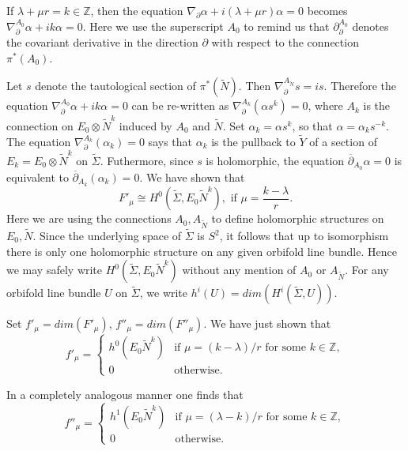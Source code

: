 \documentclass{amsart}
\theoremstyle{definition}
\theoremstyle{remark}
\numberwithin{equation}{section}
\begin{document}
If $\lambda + \mu r = k \in \mathbb{Z}$, then the equation $\nabla_{\partial} \alpha + i(\lambda + \mu r)   \alpha = 0$ becomes $\nabla^{A_0}_{\partial} \alpha + ik \alpha = 0$. Here we use the superscript $A_0$ to remind us that $\partial^{A_0}_\partial$ denotes the covariant derivative in the direction $\partial$ with respect to the connection $\pi^*(A_0)$.

Let $s$ denote the tautological section of $\pi^*(\widetilde{N})$. Then $\nabla^{A_{\widetilde{N}}}_{\partial} s = is$. Therefore the equation $\nabla^{A_0}_{\partial} \alpha + ik \alpha = 0$ can be re-written as $\nabla_{\partial}^{A_k}( \alpha s^{k} ) = 0$, where $A_k$ is the connection on $E_0 \otimes \widetilde{N}^{k}$ induced by $A_0$ and $\widetilde{N}$. Set $\alpha_k = \alpha s^k$, so that $\alpha = \alpha_k s^{-k}$. The equation $\nabla_{\partial}^{A_k}( \alpha_k ) = 0$ says that $\alpha_k$ is the pullback to $\widetilde{Y}$ of a section of $E_k = E_0 \otimes \widetilde{N}^k$ on $\widetilde{\Sigma}$. Futhermore, since $s$ is holomorphic, the equation $\overline{\partial}_{A_0} \alpha = 0$ is equivalent to $\overline{\partial}_{A_k}( \alpha_k) = 0$. We have shown that
\[
F'_\mu \cong H^0( \widetilde{\Sigma} , E_0 \widetilde{N}^k), \text{ if } \mu = \frac{k - \lambda}{r}.
\]
Here we are using the connections $A_0, A_{\widetilde{N}}$ to define holomorphic structures on $E_0, \widetilde{N}$. Since the underlying space of $\widetilde{\Sigma}$ is $S^2$, it follows that up to isomorphism there is only one holomorphic structure on any given orbifold line bundle. Hence we may safely write $H^0( \widetilde{\Sigma} , E_0 \widetilde{N}^k)$ without any mention of $A_0$ or $A_{\widetilde{N}}$. For any orbifold line bundle $U$ on $\widetilde{\Sigma}$, we write $h^i(U) = dim( H^i( \widetilde{\Sigma} , U ))$.

Set $f'_\mu = dim(F'_\mu)$, $f''_\mu = dim(F''_\mu)$. We have just shown that
\[
f'_\mu = \begin{cases} h^0(E_0 \widetilde{N}^k) & \text{if } \mu = (k-\lambda)/r \text{ for some } k \in \mathbb{Z}, \\ 0 & \text{otherwise.} \end{cases}
\]

In a completely analogous manner one finds that
\[
f''_\mu = \begin{cases} h^1(E_0 \widetilde{N}^k) & \text{if } \mu = (\lambda-k)/r \text{ for some } k \in \mathbb{Z}, \\ 0 & \text{otherwise.} \end{cases}
\]
\end{document}
